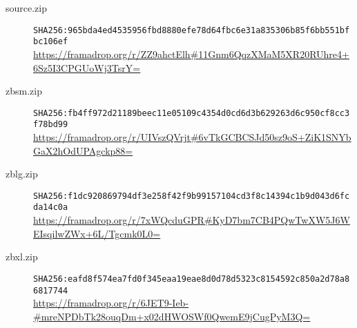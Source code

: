 \documentclass[letterpaper,twocolumn,10pt]{article}
\begin{document}
\begin{description}
\item[source.zip]
{\tiny\texttt{SHA256:965bda4ed4535956fbd8880efe78d64fbc6e31a835306b85f6bb551bfbc106ef}}\\
\url{https://framadrop.org/r/ZZ9ahctElh#11Gnm6QqzXMaM5XR20RUhre4+6Sz5I3CPGUoWj3TsrY=}
\item[zbsm.zip]
{\tiny\texttt{SHA256:fb4ff972d21189beec11e05109c4354d0cd6d3b629263d6c950cf8cc3f78bd99}}\\
\url{https://framadrop.org/r/UIVszQVrjt#6vTkGCBCSJd50sz9oS+ZiK1SNYbGaX2hOdUPAgckp88=}
\item[zblg.zip]
{\tiny\texttt{SHA256:f1dc920869794df3e258f42f9b99157104cd3f8c14394c1b9d043d6fcda14c0a}}\\
\url{https://framadrop.org/r/7xWQcduGPR#KyD7bm7CB4PQwTwXW5J6WEIsqilwZWx+6L/Tgcmk0L0=}
\item[zbxl.zip]
{\tiny\texttt{SHA256:eafd8f574ea7fd0f345eaa19eae8d0d78d5323c8154592c850a2d78a86817744}}\\
\url{https://framadrop.org/r/6JET9-Ieb-#mreNPDbTk28ouqDm+x02dHWOSWf0QwemE9jCugPyM3Q=}
\end{description}


\nocite{190996}



\end{document}
